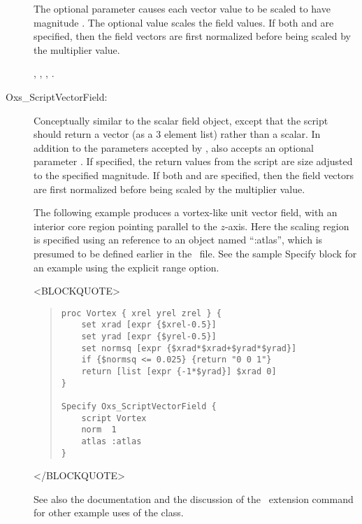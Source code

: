 \begin{description}
   The optional  parameter causes each vector value to be
   scaled to have magnitude .  The optional
    value scales the field values.  If both
    and  are specified, then the field vectors
   are first normalized before being scaled by the multiplier value.

   \begin{ExampleMifs}
     , ,
     , .
   \end{ExampleMifs}

%
\item[Oxs\_ScriptVectorField:\label{item:ScriptVectorField}]
Conceptually similar to the
 scalar
field object,
except that the script should return a vector (as a 3 element list)
rather than a scalar.  In addition to the parameters accepted by
,  also accepts
an optional parameter .  If specified, the return
values from the script are size adjusted to the specified magnitude.
If both  and  are specified, then
the field vectors are first normalized before being scaled by the
multiplier value.

The following example produces a vortex-like unit vector field, with
an interior core region pointing parallel to the $z$-axis.  Here the
scaling region is specified using an  reference to an
object named ``:atlas'', which is presumed to be defined earlier in
the \MIF\ file.  See the  sample Specify
block for an example using the explicit range option.
\begin{rawhtml}
<BLOCKQUOTE>
\end{rawhtml}
\begin{quote}
\begin{verbatim}
proc Vortex { xrel yrel zrel } {
    set xrad [expr {$xrel-0.5}]
    set yrad [expr {$yrel-0.5}]
    set normsq [expr {$xrad*$xrad+$yrad*$yrad}]
    if {$normsq <= 0.025} {return "0 0 1"}
    return [list [expr {-1*$yrad}] $xrad 0]
}

Specify Oxs_ScriptVectorField {
    script Vortex
    norm  1
    atlas :atlas
}
\end{verbatim}
\end{quote}
\begin{rawhtml}
</BLOCKQUOTE>
\end{rawhtml}
See also the
documentation and the discussion of the
 \MIF\ extension command
for other example uses of the  class.


\end{description}
